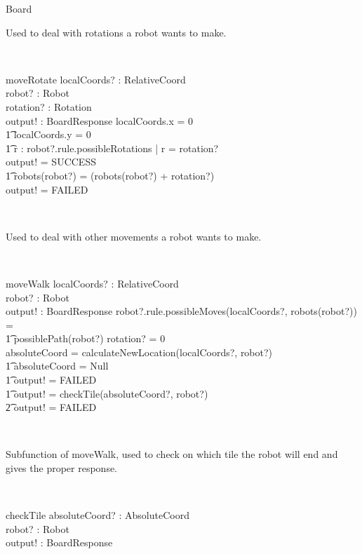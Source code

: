 \documentclass[12pt]{article}
\begin{document}
\begin{class}{Board}
\begin{classcom}
Used to deal with rotations a robot wants to make.
\end{classcom} \\
\begin{schema}{moveRotate}
localCoords? : RelativeCoord \\
robot? : Robot \\
rotation? : Rotation \\
output! : BoardResponse
\where
\IF localCoords.x = 0 \\ \t1
localCoords.y = 0 \\ \t1
 \exists r : robot?.rule.possibleRotations | r = rotation?\\
\THEN output! = SUCCESS \\ \t1
robots(robot?) = (robots(robot?) + rotation?)  \\
\ELSE output! = FAILED
\end{schema} \\
\begin{classcom}
Used to deal with other movements a robot wants to make.
\end{classcom} \\
\begin{schema}{moveWalk}
localCoords? : RelativeCoord \\
robot? : Robot \\
output! : BoardResponse
\where
\IF robot?.rule.possibleMoves(localCoords?, robots(robot?)) = \\ \t1
possiblePath(robot?) \wedge rotation? = 0 \\
\THEN absoluteCoord = calculateNewLocation(localCoords?, robot?)\\ \t1
\IF absoluteCoord = Null \\ \t1
\THEN output! = FAILED \\ \t1
\ELSE output! = checkTile(absoluteCoord?, robot?)\\ \t2
\ELSE output! = FAILED
\end{schema} \\
\znewpage
\begin{classcom}
Subfunction of moveWalk, used to check on which tile the robot will end and gives the proper response.
\end{classcom} \\
\begin{schema}{checkTile}
absoluteCoord? : AbsoluteCoord \\
robot? : Robot \\
output! : BoardResponse

\end{schema}
\end{class}
\end{document}
